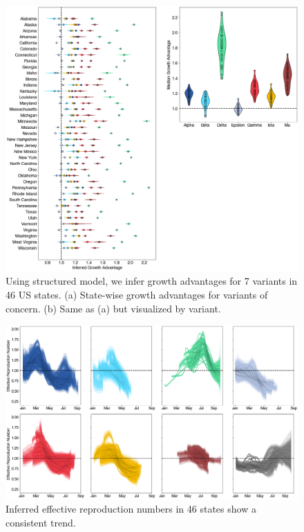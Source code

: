 \documentclass[11pt,oneside,letterpaper]{article}
\begin{document}
\begin{figure}
  \centering
  \includegraphics[width=\linewidth]{figs/fig_3_growth_advantages.png}
  \caption{Using structured model, we infer growth advantages for 7 variants in 46 US states.
  (a) State-wise growth advantages for variants of concern.
  (b) Same as (a) but visualized by variant.}%
  \label{fig:3}
\end{figure}

\begin{figure}
  \centering
  \includegraphics[width=\linewidth]{figs/fig_4_rt_consensus.png}
  \caption{Inferred effective reproduction numbers in 46 states show a consistent trend.}%
  \label{fig:4}
\end{figure}
\end{document}
